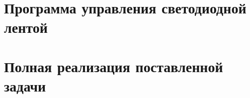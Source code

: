 \section{Программа управления светодиодной лентой}



\section{Полная реализация поставленной задачи}


